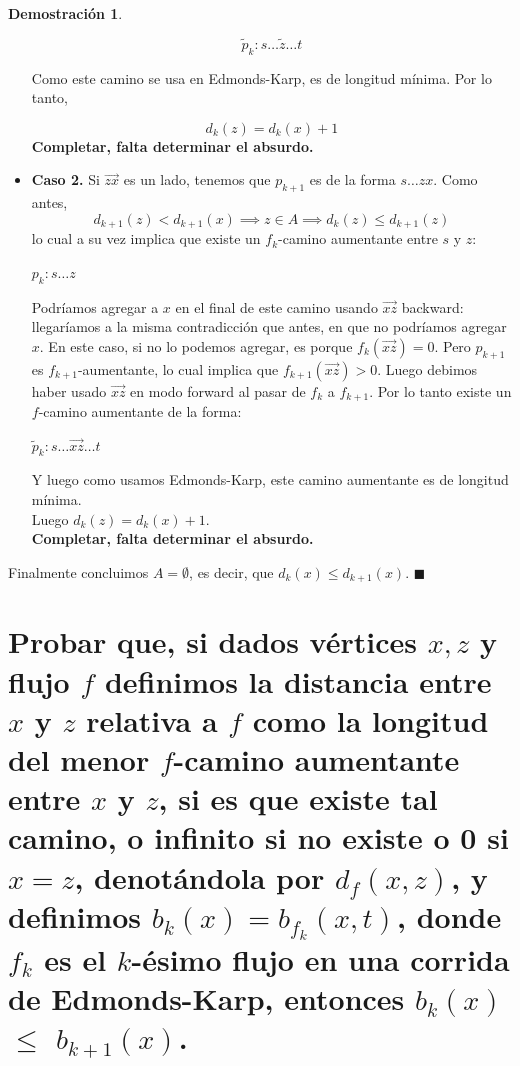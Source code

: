 \documentclass[11pt, a4paper]{article}
\theoremstyle{definition}
\newtheorem*{demostracion}{Demostración}
\begin{document}
\begin{demostracion}
\begin{itemize}
        \[ \tilde{p}_k : s \ldots \tilde{z} \ldots t \]
        
        Como este camino se usa en Edmonds-Karp, es de longitud mínima. Por lo tanto,
        
        \[ d_k(z) = d_k(x) + 1 \]
        \textbf{Completar, falta determinar el absurdo.}


        \item \textbf{Caso 2.} Si $\overrightarrow{zx}$ es un lado, tenemos que $p_{k+1}$ es de la forma $s \ldots zx$. Como antes, 
        \[ d_{k+1}(z) < d_{k+1}(x) \implies z \in A \implies d_k(z) \leq d_{k+1}(z) \]
        lo cual a su vez implica que existe un $f_k$-camino aumentante entre $s$ y $z$:
        \begin{center}
            $p_k: s \ldots z$
        \end{center}
        Podríamos agregar a $x$ en el final de este camino usando $\overrightarrow{xz}$ backward: llegaríamos a la misma contradicción que antes, en 
        que no podríamos agregar $x$. En este caso, si no lo podemos agregar, es porque $f_k(\overrightarrow{xz})=0$. Pero $p_{k+1}$ es 
        $f_{k+1}$-aumentante, lo cual implica que $f_{k+1}(\overrightarrow{xz})>0$. Luego debimos haber usado $\overrightarrow{xz}$ en modo forward al 
        pasar de $f_k$ a $f_{k+1}$. Por lo tanto existe un $f$-camino aumentante de la forma:
        \begin{center}
            $\tilde{p}_k: s \ldots \overrightarrow{xz} \ldots t$
        \end{center}
        Y luego como usamos Edmonds-Karp, este camino aumentante es de longitud mínima.\\
        Luego $d_k(z) = d_k(x) + 1$.\\
        \textbf{Completar, falta determinar el absurdo.}
    \end{itemize}
    Finalmente concluimos $A=\emptyset$, es decir, que $d_k(x) \leq d_{k+1}(x)$. $\blacksquare$
\end{demostracion}

\section{Probar que, si dados vértices $x,z$ y flujo $f$ definimos la distancia entre $x$ y $z$ relativa a $f$ como la longitud del menor
        $f$-camino aumentante entre $x$ y $z$, si es que existe tal camino, o infinito si no existe o 0 si $x=z$, denotándola por $d_f(x,z)$,
        y definimos $b_k(x)=b_{f_k}(x,t)$, donde $f_k$ es el $k$-ésimo flujo en una corrida de Edmonds-Karp, entonces $b_k(x)$ $\leq$ $b_{k+1}(x)$.}
\end{document}
